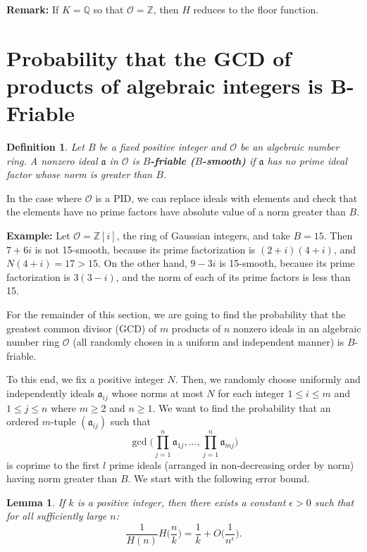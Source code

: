 \documentclass[12pt]{amsart}
\newtheorem{lemma}[theorem]{Lemma}
\newtheorem{definition}[theorem]{Definition}
\theoremstyle{definition}
\begin{document}
\noindent \textbf{Remark:} If $K=\mathbb{Q}$ so that $\mathcal{O} = \mathbb{Z}$, then $H$ reduces to the floor function. 

\section{Probability that the GCD of products of algebraic integers is B-Friable}

\begin{definition} Let $B$ be a fixed positive integer and $\mathcal{O}$ be an algebraic number ring. A nonzero ideal $\mathfrak{a}$ in $\mathcal{O}$ is \textbf{$B$-friable ($B$-smooth)} if $\mathfrak{a}$ has no prime ideal factor whose norm is greater than $B$. 
\end{definition}

In the case where $\mathcal{O}$ is a PID, we can replace ideals with elements and check that the elements have no prime factors have absolute value of a norm greater than $B$.

\noindent \textbf{Example:} Let $\mathcal{O} = \mathbb{Z}[i]$, the ring of Gaussian integers, and take $B =  15$. Then $7 + 6i$ is not 15-smooth, because its prime factorization is $(2+i)(4+i)$, and $N(4+i) = 17 > 15$. On the other hand, $9-3i$ is 15-smooth, because its prime factorization is $3(3 - i)$, and the norm of each of its prime factors is less than 15.

For the remainder of this section, we are going to find the probability that the greatest common divisor (GCD) of $m$ products of $n$ nonzero ideals in an algebraic number ring $\mathcal{O}$ (all randomly chosen in a uniform and independent manner) is $B$-friable. 

\vspace{.1 in}

To this end, we fix a positive integer $N$. Then, we randomly choose uniformly and independently ideals $\mathfrak{a}_{ij}$ whose norms at most $N$ for each integer $1 \leq i \leq m$ and $1 \leq j \leq n$ where $m \geq 2$ and $n \geq 1$. We want to find the probability that an ordered $m$-tuple $(\mathfrak{a}_{ij})$ such that 
$$\gcd\Big(\prod_{j=1}^n \mathfrak{a}_{1j}, ..., \prod_{j=1}^n \mathfrak{a}_{mj}\Big)$$
is coprime to the first $l$ prime ideals (arranged in non-decreasing order by norm) having norm greater than $B$. We start with the following error bound.

\begin{lemma}\label{H-estimate-frac} If $k$ is a positive integer, then there exists a constant $\epsilon > 0$ such that for all sufficiently large $n$:
	$$\frac{1}{H(n)} H\Big(\frac{n}{k}\Big) = \frac{1}{k} + O\Big(\frac{1}{n^{\epsilon}}\Big).$$
\end{lemma}
\end{document}
